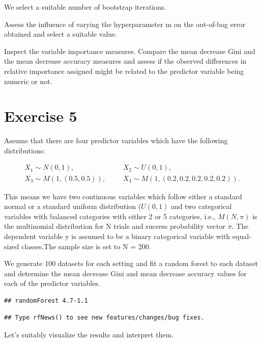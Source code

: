 \documentclass[
]{article}
\begin{document}
We select a suitable number of bootstrap iterations.

Assess the influence of varying the hyperparameter m on the out-of-bag
error obtained and select a suitable value.

Inspect the variable importance measures. Compare the mean decrease Gini
and the mean decrease accuracy measures and assess if the observed
differences in relative importance assigned might be related to the
predictor variable being numeric or not.

\section{Exercise 5}\label{exercise-5}

Assume that there are four predictor variables which have the following
distributions:

\begin{align}
X_1 \sim N(0, 1),&& &X_2 \sim U(0, 1), \\
X_3 \sim M(1, (0.5, 0.5)),&& &X_4 \sim M(1, (0.2, 0.2, 0.2, 0.2, 0.2)).
\end{align}

This means we have two continuous variables which follow either a
standard normal or a standard uniform distribution (\(U(0, 1)\) and two
categorical variables with balanced categories with either 2 or 5
categories, i.e., \(M(N, \pi)\) is the multinomial distribution for N
trials and success probability vector \(\pi\). The dependent variable y
is assumed to be a binary categorical variable with equal-sized
classes.The sample size is set to N = 200.

We generate 100 datasets for each setting and fit a random forest to
each dataset and determine the mean decrease Gini and mean decrease
accuracy values for each of the predictor variables.

\begin{verbatim}
## randomForest 4.7-1.1
\end{verbatim}

\begin{verbatim}
## Type rfNews() to see new features/changes/bug fixes.
\end{verbatim}

Let's suitably visualize the results and interpret them.
\end{document}
